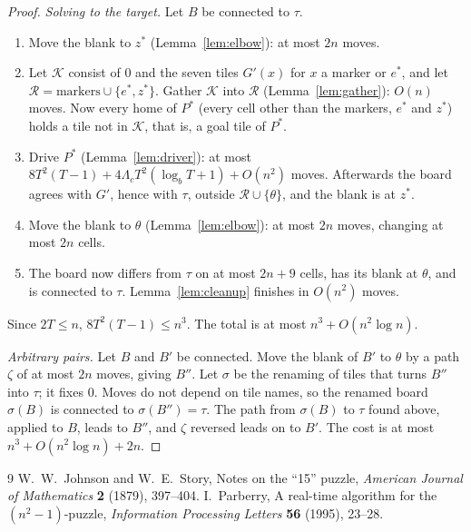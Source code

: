 \documentclass[11pt]{amsart}
\theoremstyle{definition}
\begin{document}
\begin{proof}
\emph{Solving to the target.} Let $B$ be connected to $\tau$.
\begin{enumerate}[nosep]
\item Move the blank to $z^*$ (Lemma~\ref{lem:elbow}): at most $2n$ moves.
\item Let $\mathcal K$ consist of $0$ and the seven tiles $G'(x)$ for $x$ a marker or $e^*$, and let
  $\mathcal R=\text{markers}\cup\{e^*,z^*\}$. Gather $\mathcal K$ into $\mathcal R$ (Lemma~\ref{lem:gather}): $O(n)$ moves. Now every
  home of $P^*$ (every cell other than the markers, $e^*$ and $z^*$) holds a tile not in $\mathcal K$, that is, a goal tile
  of $P^*$.
\item Drive $P^*$ (Lemma~\ref{lem:driver}): at most $8T^2(T-1)+4\Lambda_cT^2(\log_bT+1)+O(n^2)$ moves. Afterwards the
  board agrees with $G'$, hence with $\tau$, outside $\mathcal R\cup\{\theta\}$, and the blank is at $z^*$.
\item Move the blank to $\theta$ (Lemma~\ref{lem:elbow}): at most $2n$ moves, changing at most $2n$ cells.
\item The board now differs from $\tau$ on at most $2n+9$ cells, has its blank at $\theta$, and is connected to $\tau$.
  Lemma~\ref{lem:cleanup} finishes in $O(n^2)$ moves.
\end{enumerate}
Since $2T\le n$, $8T^2(T-1)\le n^3$. The total is at most $n^3+O(n^2\log n)$.

\emph{Arbitrary pairs.} Let $B$ and $B'$ be connected. Move the blank of $B'$ to $\theta$ by a path $\zeta$ of at most
$2n$ moves, giving $B''$. Let $\sigma$ be the renaming of tiles that turns $B''$ into $\tau$; it fixes $0$.
Moves do not depend on tile names, so the renamed board $\sigma(B)$ is connected to $\sigma(B'')=\tau$. The path
from $\sigma(B)$ to $\tau$ found above, applied to $B$, leads to $B''$, and $\zeta$ reversed leads on to $B'$. The cost is at
most $n^3+O(n^2\log n)+2n$.
\end{proof}

\begin{thebibliography}{9}
 W.~W.~Johnson and W.~E.~Story, Notes on the ``15'' puzzle,
\emph{American Journal of Mathematics} \textbf{2} (1879), 397--404.
 I.~Parberry, A real-time algorithm for the $(n^2-1)$-puzzle,
\emph{Information Processing Letters} \textbf{56} (1995), 23--28.
\end{thebibliography}
\end{document}
